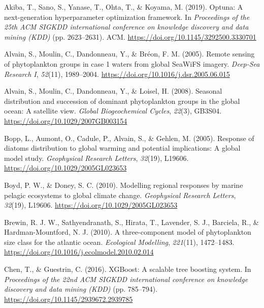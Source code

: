\documentclass[
]{agujournal2019}
\newlength{\cslhangindent}
\newenvironment{CSLReferences}[2] %
 {\begin{list}{}{%
  \setlength{\itemindent}{0pt}
  \setlength{\leftmargin}{0pt}
  \setlength{\parsep}{0pt}
  \ifodd #1
   \setlength{\leftmargin}{\cslhangindent}
   \setlength{\itemindent}{-1\cslhangindent}
  \fi
  \setlength{\itemsep}{#2\baselineskip}}}
 {\end{list}}
\begin{document}
\label{refs}
\begin{CSLReferences}{1}{0}
\vspace{1em}

Akiba, T., Sano, S., Yanase, T., Ohta, T., \& Koyama, M. (2019). Optuna:
A next-generation hyperparameter optimization framework. In
\emph{Proceedings of the 25th ACM SIGKDD international conference on
knowledge discovery and data mining (KDD)} (pp. 2623--2631). ACM.
\url{https://doi.org/10.1145/3292500.3330701}

Alvain, S., Moulin, C., Dandonneau, Y., \& Bréon, F. M. (2005). Remote
sensing of phytoplankton groups in case 1 waters from global SeaWiFS
imagery. \emph{Deep-Sea Research I}, \emph{52}(11), 1989--2004.
\url{https://doi.org/10.1016/j.dsr.2005.06.015}

Alvain, S., Moulin, C., Dandonneau, Y., \& Loisel, H. (2008). Seasonal
distribution and succession of dominant phytoplankton groups in the
global ocean: A satellite view. \emph{Global Biogeochemical Cycles},
\emph{22}(3), GB3S04. \url{https://doi.org/10.1029/2007GB003154}

Bopp, L., Aumont, O., Cadule, P., Alvain, S., \& Gehlen, M. (2005).
Response of diatoms distribution to global warming and potential
implications: A global model study. \emph{Geophysical Research Letters},
\emph{32}(19), L19606. \url{https://doi.org/10.1029/2005GL023653}

Boyd, P. W., \& Doney, S. C. (2010). Modelling regional responses by
marine pelagic ecosystems to global climate change. \emph{Geophysical
Research Letters}, \emph{32}(19), L19606.
\url{https://doi.org/10.1029/2005GL023653}

Brewin, R. J. W., Sathyendranath, S., Hirata, T., Lavender, S. J.,
Barciela, R., \& Hardman-Mountford, N. J. (2010). A three-component
model of phytoplankton size class for the atlantic ocean.
\emph{Ecological Modelling}, \emph{221}(11), 1472--1483.
\url{https://doi.org/10.1016/j.ecolmodel.2010.02.014}

Chen, T., \& Guestrin, C. (2016). {XGBoost}: A scalable tree boosting
system. In \emph{Proceedings of the 22nd ACM SIGKDD international
conference on knowledge discovery and data mining (KDD)} (pp. 785--794).
\url{https://doi.org/10.1145/2939672.2939785}


\end{CSLReferences}
\end{document}
